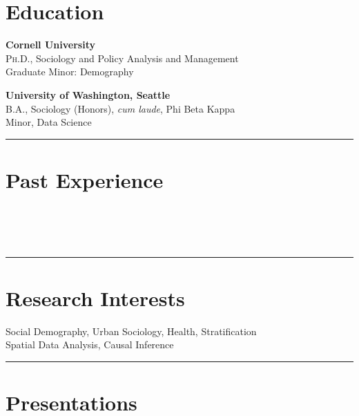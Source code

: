 \documentclass[11pt]{article} %
\begin{document}
\section*{Education}
 
  \textbf{Cornell University} \\
 \textsc{Ph.D.}, Sociology and Policy Analysis and Management \\
	Graduate Minor: Demography
 
 \smallskip
{} \textbf{University of Washington, Seattle} \\
\textsc{B.A.}, Sociology (Honors), \emph{cum laude}, Phi Beta Kappa \\
Minor, Data Science \\

\noindent\rule{16cm}{0.4pt}

\section*{Past Experience}

 \\
  \\
\\
\noindent\rule{16cm}{0.4pt}

\section*{Research Interests}

\large{}Social Demography, Urban Sociology, Health, Stratification \\
\large{} Spatial Data Analysis, Causal Inference \\
\noindent\rule{16cm}{0.4pt}
\section*{Presentations}
\end{document}

